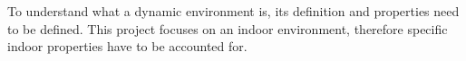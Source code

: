 To understand what a dynamic environment is, its definition and properties need to be defined. This project focuses on an indoor environment, therefore specific indoor properties have to be accounted for.